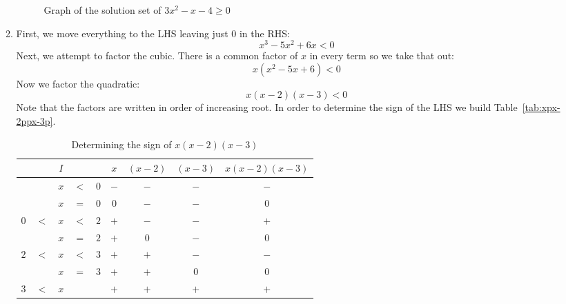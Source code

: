 \documentclass{article}
\newcommand{\ds}{\displaystyle}
\begin{document}
\begin{enumerate}
\begin{enumerate}
\begin{figure}[htbp]
      \caption{Graph of the solution set of $3x^2-x-4\ge 0$}
      \label{fig:3x2-x-4GE0}
    \end{figure}
  \item %
    First, we move everything to the LHS leaving just $0$ in the RHS:
    \begin{equation*}
      x^3-5x^2+6x < 0
    \end{equation*}
    Next, we attempt to factor the cubic.  There is a common factor of
    $x$ in every term so we take that out:
    \begin{equation*}
      x(x^2-5x+6) < 0
    \end{equation*}
    Now we factor the quadratic:
    \begin{equation*}
      x(x-2)(x-3) < 0
    \end{equation*}
    Note that the factors are written in order of increasing root.  In
    order to determine the sign of the LHS we build
    Table~\ref{tab:xpx-2ppx-3p}.
    \begin{table}[htbp]
      \centering
      \begin{tabular}{|ccccc||c|c|c||c|}
        \hline
        \multicolumn{5}{|c||}{$I$} & $x$ & $(x-2)$ & $(x-3)$ & $x(x-2)(x-3)$ \\
        \hline\hline
        $  $&$  $&$ x$&$ <$&$ 0$   & $-$ & $-$     & $-$     & $-$           \\
        \hline
        $  $&$  $&$ x$&$ =$&$ 0$   & $0$ & $-$     & $-$     & $0$           \\
        \hline
        $ 0$&$ <$&$ x$&$ <$&$ 2$   & $+$ & $-$     & $-$     & $+$           \\
        \hline
        $  $&$  $&$ x$&$ =$&$ 2$   & $+$ & $0$     & $-$     & $0$           \\
        \hline
        $ 2$&$ <$&$ x$&$ <$&$ 3$   & $+$ & $+$     & $-$     & $-$           \\
        \hline
        $  $&$  $&$ x$&$ =$&$ 3$   & $+$ & $+$     & $0$     & $0$           \\
        \hline
        $ 3$&$ <$&$ x$&$  $&$  $   & $+$ & $+$     & $+$     & $+$           \\
        \hline
      \end{tabular}
      \caption{Determining the sign of $x(x-2)(x-3)$}

\end{table}
\end{enumerate}
\end{enumerate}
\end{document}
